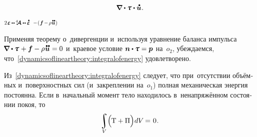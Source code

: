\begin{otherlanguage}{russian}
\[\begin{array}{c}
\tikzmark{NablaDotTauDynamicsBegin} \boldnabla \dotp \mathboldtau \tikzmark{NablaDotTauDynamicsEnd} \dotp \mathdotabove{\bm{u}} \hspace{0.1ex}.
\end{array}\]%
%
{${\scalebox{0.75}{$ 2 \hspace{.2ex} \mathboldepsilon \hspace{-0.1ex} \dotdotp \hspace{-0.1ex} \stiffnesstensor \dotdotp \mathdotabove{\mathboldepsilon} $}}$}
%
{${\scalebox{0.75}{$ - \hspace{.2ex} (\hspace{.12ex} \bm{f} \hspace{-0.2ex} - \hspace{-0.2ex} \rho \hspace{0.1ex} \mathdotdotabove{\bm{u}} \hspace{.12ex}) $}}$}

\vspace{.66em} \noindent Применяя теорему о~дивергенции и~используя уравнение баланса импульса ${\hspace{-0.24ex}\boldnabla \dotp \mathboldtau \hspace{0.15ex} + \bm{f} - \rho \hspace{0.1ex} \mathdotdotabove{\bm{u}} \hspace{.1ex} = 0}$ и~краевое условие ${\bm{n} \dotp \mathboldtau = \bm{p}}$ на~$o_2$, убеждаемся, что~\eqref{dynamicsoflineartheory:integralofenergy} удовлетворено.

Из~\eqref{dynamicsoflineartheory:integralofenergy} следует, что при~отсутствии объёмных и~поверхностных сил (и~закреплении на~$o_1$) полная механическая энергия постоянна. Если в~начальный момент тело находилось в~ненапряжённом состоянии покоя, то
\nopagebreak\begin{equation}\label{dynamicsoflineartheory:zeroenergyatinitialmoment}
\scalebox{.96}{$\displaystyle \integral\displaylimits_V$} \hspace{-0.5ex} \left(^{\mathstrut} \hspace{-0.24ex} \mathrm{T} + \Pi \right) \hspace{-0.32ex} dV \hspace{-0.2ex} = \hspace{.16ex} 0 \hspace{.1ex}.
\vspace{-0.25em}
\end{equation}


\end{otherlanguage}
